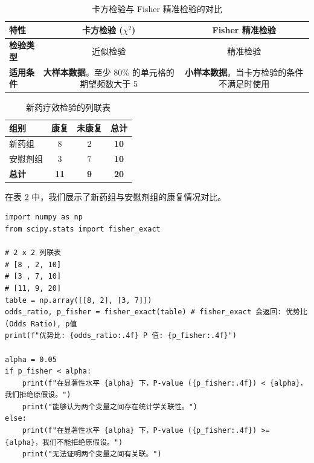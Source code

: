 \begin{table}[H]
    \centering
    \caption{卡方检验与 Fisher 精准检验的对比}
    \label{tab:chi2_vs_fisher}
    \begin{tabularx}{\textwidth}{l c c}
        \toprule
        \textbf{特性}                          & \textbf{卡方检验 ($\chi^2$)} & \textbf{Fisher 精准检验} \\
        \midrule

        \textbf{检验类型}                        &
        近似检验                                 &
        精准检验                                                                                   \\

        \addlinespace %

        \textbf{适用条件}                        &
        \textbf{大样本数据}。至少 80\% 的单元格的期望频数大于 5 &
        \textbf{小样本数据}。当卡方检验的条件不满足时使用                                                          \\
        \bottomrule
    \end{tabularx}
\end{table}

\begin{table}[H]
    \centering
    \caption{新药疗效检验的列联表}
    \label{tab:drug_trial}
    \begin{tabular}{l c c c}
        \toprule
        \textbf{组别} & \textbf{康复} & \textbf{未康复} & \textbf{总计} \\
        \midrule
        新药组         & 8           & 2            & \textbf{10} \\
        安慰剂组        & 3           & 7            & \textbf{10} \\
        \midrule
        \textbf{总计} & \textbf{11} & \textbf{9}   & \textbf{20} \\
        \bottomrule
    \end{tabular}
\end{table}

在表 \ref{tab:drug_trial} 中，我们展示了新药组与安慰剂组的康复情况对比。

\begin{lstlisting}[style=python]
import numpy as np
from scipy.stats import fisher_exact

# 2 x 2 列联表
# [8 , 2, 10]
# [3 , 7, 10]
# [11, 9, 20]
table = np.array([[8, 2], [3, 7]])
odds_ratio, p_fisher = fisher_exact(table) # fisher_exact 会返回: 优势比 (Odds Ratio), p值
print(f"优势比: {odds_ratio:.4f} P 值: {p_fisher:.4f}")

alpha = 0.05
if p_fisher < alpha:
    print(f"在显著性水平 {alpha} 下，P-value ({p_fisher:.4f}) < {alpha}，我们拒绝原假设。")
    print("能够认为两个变量之间存在统计学关联性。")
else:
    print(f"在显著性水平 {alpha} 下，P-value ({p_fisher:.4f}) >= {alpha}，我们不能拒绝原假设。")
    print("无法证明两个变量之间有关联。")
\end{lstlisting}